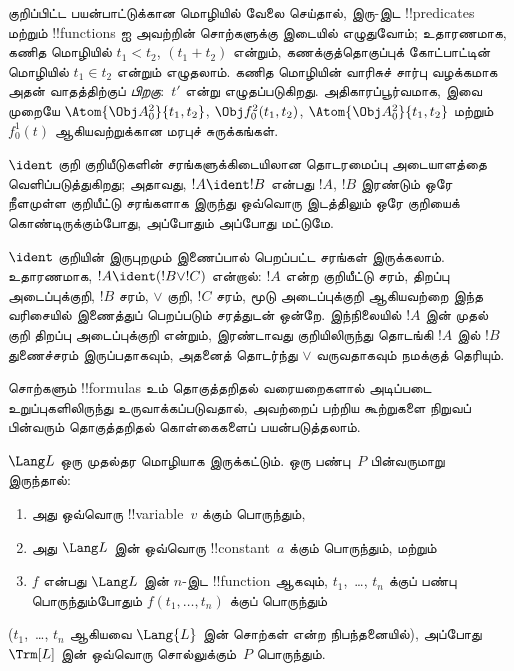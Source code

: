 \documentclass[../../../include/open-logic-section]{subfiles}
\begin{document}
குறிப்பிட்ட பயன்பாட்டுக்கான மொழியில் வேலை செய்தால், இரு-இட !!{predicate}s
மற்றும் !!{function}s ஐ அவற்றின் சொற்களுக்கு இடையில் எழுதுவோம்; உதாரணமாக,
கணித மொழியில் $t_1 < t_2$, $(t_1 + t_2)$ என்றும், கணக்குத்தொகுப்புக்
கோட்பாட்டின் மொழியில் $t_1 \in t_2$ என்றும் எழுதலாம். கணித மொழியின்
வாரிசுச் சார்பு வழக்கமாக அதன் வாதத்திற்குப் \emph{பிறகு}:~$t'$ என்று
எழுதப்படுகிறது. அதிகாரப்பூர்வமாக, இவை முறையே
$\Atom{\Obj A^2_0}{t_1, t_2}$, $\Obj f^2_0(t_1, t_2)$,
$\Atom{\Obj A^2_0}{t_1, t_2}$ மற்றும் $f^1_0(t)$ ஆகியவற்றுக்கான
மரபுச் சுருக்கங்கள்.

\begin{defn}[தொடரமைப்பு அடையாளம்]
$\ident$ குறி குறியீடுகளின் சரங்களுக்கிடையிலான தொடரமைப்பு அடையாளத்தை
வெளிப்படுத்துகிறது; அதாவது, $!A \ident !B$ என்பது $!A$, $!B$ இரண்டும் ஒரே
நீளமுள்ள குறியீட்டு சரங்களாக இருந்து ஒவ்வொரு இடத்திலும் ஒரே குறியைக்
கொண்டிருக்கும்போது, அப்போதும் அப்போது மட்டுமே.
\end{defn}

$\ident$ குறியின் இருபுறமும் இணைப்பால் பெறப்பட்ட சரங்கள் இருக்கலாம்.
உதாரணமாக, $!A \ident (!B \lor !C)$ என்றால்: $!A$ என்ற குறியீட்டு சரம்,
திறப்பு அடைப்புக்குறி, $!B$ சரம், $\lor$ குறி, $!C$ சரம், மூடு
அடைப்புக்குறி ஆகியவற்றை இந்த வரிசையில் இணைத்துப் பெறப்படும் சரத்துடன்
ஒன்றே. இந்நிலையில் $!A$ இன் முதல் குறி திறப்பு அடைப்புக்குறி என்றும்,
இரண்டாவது குறியிலிருந்து தொடங்கி $!A$ இல் $!B$ துணைச்சரம் இருப்பதாகவும்,
அதனைத் தொடர்ந்து $\lor$ வருவதாகவும் நமக்குத் தெரியும்.

சொற்களும் !!{formula}s உம் தொகுத்தறிதல் வரையறைகளால் அடிப்படை உறுப்புகளிலிருந்து
உருவாக்கப்படுவதால், அவற்றைப் பற்றிய கூற்றுகளை நிறுவப் பின்வரும்
தொகுத்தறிதல் கொள்கைகளைப் பயன்படுத்தலாம்.

\begin{lem}
    $\Lang L$ ஒரு முதல்தர மொழியாக இருக்கட்டும்.
    ஒரு பண்பு~$P$ பின்வருமாறு இருந்தால்:
    \begin{enumerate}
        \item அது ஒவ்வொரு !!{variable}~$v$ க்கும் பொருந்தும்,
        \item அது $\Lang L$ இன் ஒவ்வொரு !!{constant}~$a$ க்கும் பொருந்தும்,
        மற்றும்
        \item $f$ என்பது $\Lang L$ இன் $n$-இட !!{function} ஆகவும்,
            $t_1$,~\dots, $t_n$ க்குப் பண்பு பொருந்தும்போதும்
            $f(t_1,\dotsc,t_n)$ க்குப் பொருந்தும்
    \end{enumerate}
    ($t_1$,~\dots, $t_n$ ஆகியவை $\Lang{L}$ இன் சொற்கள் என்ற நிபந்தனையில்),
    அப்போது $\Trm[L]$ இன் ஒவ்வொரு சொல்லுக்கும்~$P$ பொருந்தும்.
\end{lem}
\end{document}
